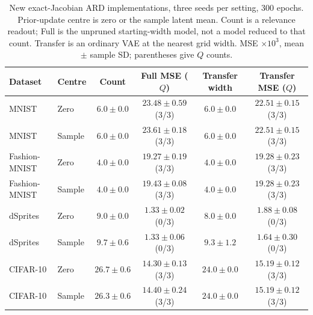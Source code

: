 \begin{table}[H]
\caption{New exact-Jacobian ARD implementations, three seeds per setting, 300 epochs. Prior-update centre is zero or the sample latent mean. Count is a relevance readout; Full is the unpruned starting-width model, not a model reduced to that count. Transfer is an ordinary VAE at the nearest grid width. MSE $\times10^3$, mean $\pm$ sample SD; parentheses give $Q$ counts.}\label{tab:ardnew}
\footnotesize
\setlength{\tabcolsep}{3pt}
\begin{tabular*}{\textwidth}{@{\extracolsep{\fill}}llcccc@{}}
\toprule
Dataset & Centre & Count & Full MSE ($Q$) & Transfer width & Transfer MSE ($Q$) \\
\midrule
MNIST & Zero & $6.0 \pm 0.0$ & $23.48 \pm 0.59$ (3/3) & $6.0 \pm 0.0$ & $22.51 \pm 0.15$ (3/3) \\
MNIST & Sample & $6.0 \pm 0.0$ & $23.61 \pm 0.18$ (3/3) & $6.0 \pm 0.0$ & $22.51 \pm 0.15$ (3/3) \\
Fashion-MNIST & Zero & $4.0 \pm 0.0$ & $19.27 \pm 0.19$ (3/3) & $4.0 \pm 0.0$ & $19.28 \pm 0.23$ (3/3) \\
Fashion-MNIST & Sample & $4.0 \pm 0.0$ & $19.43 \pm 0.08$ (3/3) & $4.0 \pm 0.0$ & $19.28 \pm 0.23$ (3/3) \\
dSprites & Zero & $9.0 \pm 0.0$ & $1.33 \pm 0.02$ (0/3) & $8.0 \pm 0.0$ & $1.88 \pm 0.08$ (0/3) \\
dSprites & Sample & $9.7 \pm 0.6$ & $1.33 \pm 0.06$ (0/3) & $9.3 \pm 1.2$ & $1.64 \pm 0.30$ (0/3) \\
CIFAR-10 & Zero & $26.7 \pm 0.6$ & $14.30 \pm 0.13$ (3/3) & $24.0 \pm 0.0$ & $15.19 \pm 0.12$ (3/3) \\
CIFAR-10 & Sample & $26.3 \pm 0.6$ & $14.40 \pm 0.24$ (3/3) & $24.0 \pm 0.0$ & $15.19 \pm 0.12$ (3/3) \\
\bottomrule\end{tabular*}
\end{table}
